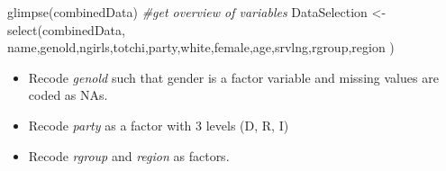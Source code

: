 \documentclass[
]{article}
\newenvironment{Shaded}{\begin{snugshade}}{\end{snugshade}}
\newcommand{\CommentTok}[1]{\textcolor[rgb]{0.56,0.35,0.01}{\textit{#1}}}
\newcommand{\FunctionTok}[1]{\textcolor[rgb]{0.00,0.00,0.00}{#1}}
\newcommand{\NormalTok}[1]{#1}
\newcommand{\OtherTok}[1]{\textcolor[rgb]{0.56,0.35,0.01}{#1}}
\newcommand{\SpecialCharTok}[1]{\textcolor[rgb]{0.00,0.00,0.00}{#1}}
\newcommand{\StringTok}[1]{\textcolor[rgb]{0.31,0.60,0.02}{#1}}
\providecommand{\tightlist}{%
  \setlength{\itemsep}{0pt}\setlength{\parskip}{0pt}}
\begin{document}
\begin{Shaded}
\begin{Highlighting}[]
\FunctionTok{glimpse}\NormalTok{(combinedData)   }\CommentTok{\#get overview of variables}
\NormalTok{DataSelection }\OtherTok{\textless{}{-}} \FunctionTok{select}\NormalTok{(combinedData, name,genold,ngirls,totchi,party,white,female,age,srvlng,rgroup,region )}
\end{Highlighting}
\end{Shaded}

\begin{itemize}
\tightlist
\item
  Recode \emph{genold} such that gender is a factor variable and missing
  values are coded as NAs.
\end{itemize}

\begin{Shaded}
\end{Shaded}

\begin{itemize}
\tightlist
\item
  Recode \emph{party} as a factor with 3 levels (D, R, I)
\end{itemize}

\begin{Shaded}
\end{Shaded}

\begin{itemize}
\tightlist
\item
  Recode \emph{rgroup} and \emph{region} as factors.
\end{itemize}
\end{document}
